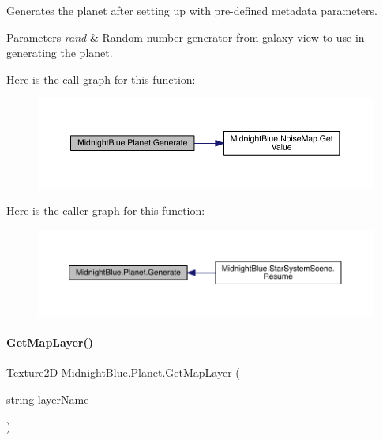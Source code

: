 Generates the planet after setting up with pre-\/defined metadata parameters. 


\begin{DoxyParams}{Parameters}
{\em rand} & Random number generator from galaxy view to use in generating the planet.\\
\hline
\end{DoxyParams}
Here is the call graph for this function\+:\nopagebreak
\begin{figure}[H]
\begin{center}
\leavevmode
\includegraphics[width=350pt]{class_midnight_blue_1_1_planet_ac7264aea3a992afb4cab0ad99c96dbb8_cgraph}
\end{center}
\end{figure}
Here is the caller graph for this function\+:\nopagebreak
\begin{figure}[H]
\begin{center}
\leavevmode
\includegraphics[width=350pt]{class_midnight_blue_1_1_planet_ac7264aea3a992afb4cab0ad99c96dbb8_icgraph}
\end{center}
\end{figure}
\hypertarget{class_midnight_blue_1_1_planet_ac3b3442ad8f168a8d9151386592eb270}{}\label{class_midnight_blue_1_1_planet_ac3b3442ad8f168a8d9151386592eb270} 
\paragraph{\texorpdfstring{Get\+Map\+Layer()}{GetMapLayer()}}
{\footnotesize\ttfamily Texture2D Midnight\+Blue.\+Planet.\+Get\+Map\+Layer (\begin{DoxyParamCaption}\item[{string}]{layer\+Name }\end{DoxyParamCaption})\hspace{0.3cm}{\ttfamily [inline]}}



